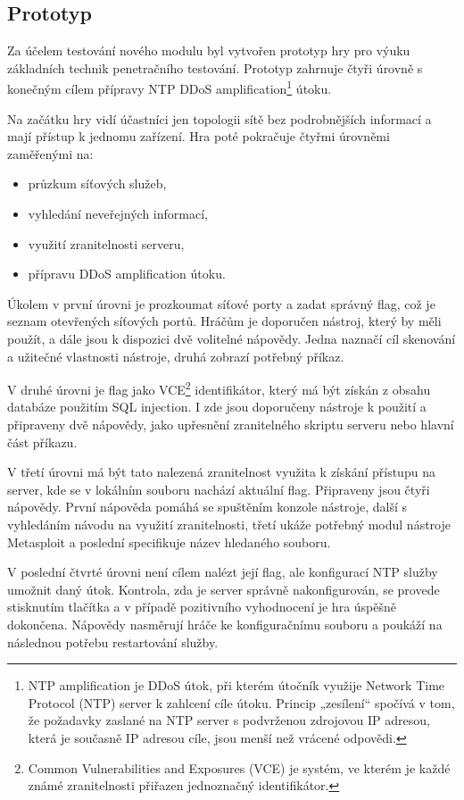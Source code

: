 \documentclass[
  digital, %
  oneside, %
  table,   %
  nolof,     %
  nolot,     %
]{fithesis3}
\begin{document}
\subsection{Prototyp}
Za účelem testování nového modulu byl vytvořen prototyp hry pro výuku základních technik penetračního testování. Prototyp zahrnuje čtyři úrovně s konečným cílem přípravy NTP DDoS amplification\footnote{NTP amplification je DDoS útok, při kterém útočník využije Network Time Protocol (NTP) server k zahlcení cíle útoku. Princip „zesílení“ spočívá v tom, že požadavky zaslané na NTP server s podvrženou zdrojovou IP adresou, která je současně IP adresou cíle, jsou menší než vrácené odpovědi.} útoku.\par
Na začátku hry vidí účastníci jen topologii sítě bez podrobnějších informací a mají přístup k jednomu zařízení. Hra poté pokračuje čtyřmi úrovněmi zaměřenými na:
\begin{itemize}
  \item průzkum síťových služeb,
  \item vyhledání neveřejných informací,
  \item využití zranitelnosti serveru,
  \item přípravu DDoS amplification útoku.
\end{itemize}
Úkolem v první úrovni je prozkoumat síťové porty a zadat správný flag, což je seznam otevřených síťových portů. Hráčům je doporučen nástroj, který by měli použít, a dále jsou k dispozici dvě volitelné nápovědy. Jedna naznačí cíl skenování a užitečné vlastnosti nástroje, druhá zobrazí potřebný příkaz.\par
V druhé úrovni je flag jako VCE\footnote{Common Vulnerabilities and Exposures (VCE) je systém, ve kterém je každé známé zranitelnosti přiřazen jednoznačný identifikátor.} identifikátor, který má být získán z obsahu databáze použitím SQL injection. I zde jsou doporučeny nástroje k použití a připraveny dvě nápovědy, jako upřesnění zranitelného skriptu serveru nebo hlavní část příkazu.\par
V třetí úrovni má být tato nalezená zranitelnost využita k získání přístupu na server, kde se v lokálním souboru nachází aktuální flag. Připraveny jsou čtyři nápovědy. První nápověda pomáhá se spuštěním konzole nástroje, další s vyhledáním návodu na využití zranitelnosti, třetí ukáže potřebný modul nástroje Metasploit a poslední specifikuje název hledaného souboru.\par
V poslední čtvrté úrovni není cílem nalézt její flag, ale konfigurací NTP služby umožnit daný útok. Kontrola, zda je server správně nakonfigurován, se provede stisknutím tlačítka a v případě pozitivního vyhodnocení je hra úspěšně dokončena. Nápovědy nasměrují hráče ke konfiguračnímu souboru a poukáží na následnou potřebu restartování služby. \cite{ctfDesign}\par
\end{document}

